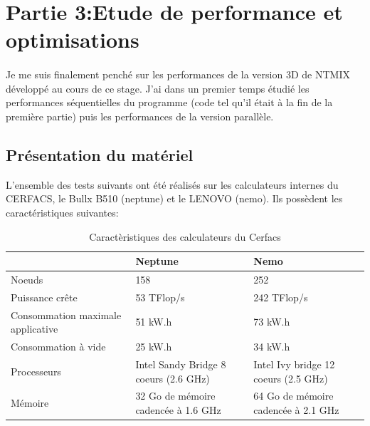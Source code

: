 \section{Partie 3:Etude de performance et optimisations}
\paragraph{}Je me suis finalement penché sur les performances de la version 3D de NTMIX développé au cours de ce stage. J'ai dans un premier temps étudié les performances séquentielles du programme (code tel qu'il était à la fin de la première partie) puis les performances de la version parallèle.
\subsection{Présentation du matériel}
L'ensemble des tests suivants ont été réalisés sur les calculateurs internes du CERFACS, le Bullx B510 (neptune) et le LENOVO (nemo). Ils possèdent les caractéristiques suivantes:

\begin{table}[h]
  \begin{center}
    \begin{tabular}{|M{3.5cm}|M{5cm}|M{5cm}|}
      \hline
      & Neptune & Nemo \\
      \hline
      Noeuds & 158 & 252 \\
      \hline
      Puissance crête & 53 TFlop/s & 242 TFlop/s \\
      \hline
      Consommation maximale applicative & 51 kW.h & 73 kW.h \\
      \hline
      Consommation à vide & 25 kW.h & 34 kW.h \\
      \hline
      Processeurs & Intel Sandy Bridge 8 coeurs (2.6 GHz) & Intel Ivy bridge 12 coeurs (2.5 GHz) \\
      \hline
      Mémoire & 32 Go de mémoire cadencée à 1.6 GHz & 64 Go de mémoire cadencée à 2.1 GHz \\
      \hline
    \end{tabular}
  \end{center}
  \caption{\label{tab:carac}Caractèristiques des calculateurs du Cerfacs}
\end{table}

